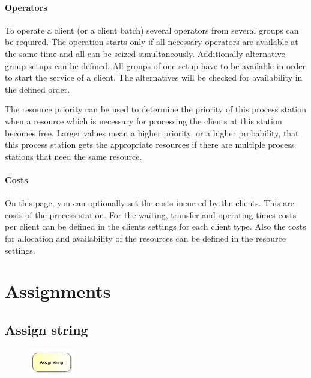 \subsubsection*{Operators}

To operate a client (or a client batch) several operators from several groups can be required.
The operation starts only if all necessary operators are available at the same time and all can be seized
simultaneously.
Additionally alternative group setups can be defined. All groups of one setup have to be available in order
to start the service of a client. The alternatives will be checked for availability in the defined order.

The resource priority can be used to determine the priority of this process station when a resource
which is necessary for processing the clients at this station becomes free. Larger values mean a
higher priority, or a higher probability, that this process station gets the appropriate resources
if there are multiple process stations that need the same resource.

\subsubsection*{Costs}

On this page, you can optionally set the costs incurred by the clients. This are costs of the process station.
For the waiting, transfer and operating times costs per client can be defined in the clients settings for each
client type. Also the costs for allocation and availability of the resources can be defined in the resource settings.





\chapter{Assignments}

\section{Assign string}
\label{ref:ModelElementAssignString}

\begin{figure}
\vspace{-22pt}
\includegraphics[width=2cm]{imageModelElementAssignString.png}
\vspace{-22pt}
\end{figure}

